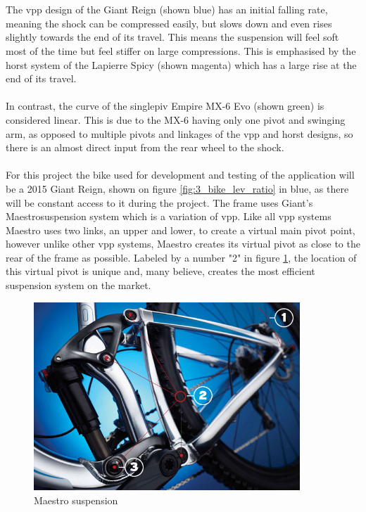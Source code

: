 		\\\\
		The \gls{vpp} design of the Giant Reign (shown blue) has an initial falling rate, meaning the \gls{shock} can be compressed easily, but slows down and even rises slightly towards the end of its travel. This means the suspension will feel soft most of the time but feel stiffer on large compressions. This is emphasised by the \gls{horst} system of the Lapierre Spicy (shown magenta) which has a large rise at the end of its travel.
		\\\\
		In contrast, the curve of the \gls{singlepiv} Empire MX-6 Evo (shown green) is considered linear. This is due to the MX-6 having only one pivot and swinging arm, as opposed to multiple pivots and linkages of the \gls{vpp} and \gls{horst} designs, so there is an almost direct input from the rear wheel to the \gls{shock}.
		\\\\
		For this project the bike used for development and testing of the application will be a 2015 Giant Reign, shown on figure \ref{fig:3_bike_lev_ratio} in blue, as there will be constant access to it during the project. The frame uses Giant's Maestro\texttrademark suspension system which is a variation of \gls{vpp}. Like all \gls{vpp} systems Maestro uses two links, an upper and lower, to create a virtual main pivot point, however unlike other \gls{vpp} systems, Maestro creates its virtual pivot as close to the rear of the frame as possible. Labeled by a number "2" in figure \ref{fig:maestro}, the location of this virtual pivot is unique and, many believe, creates the most efficient suspension system on the market.
		\begin{figure}[h!]
			\centering
			\includegraphics[width=10cm]{../images/frame_maestro.jpg}
			\caption{Maestro suspension \citep{maestroimage}}
			\label{fig:maestro}
		\end{figure}
